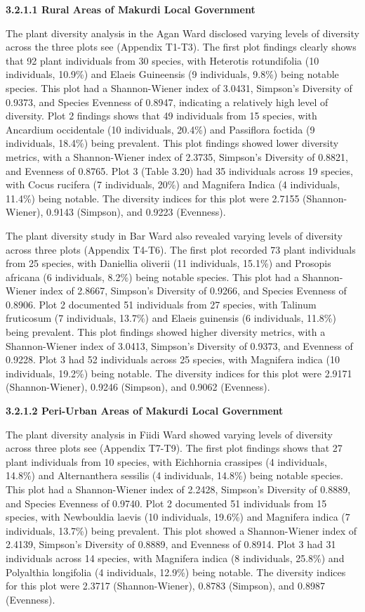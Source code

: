 {}\textbf{3.2.1.1 Rural Areas of Makurdi Local Government}

The plant diversity analysis in the Agan Ward disclosed varying levels of diversity across the three plots see (Appendix T1-T3). The first plot findings clearly shows that 92 plant individuals from 30 species, with Heterotis rotundifolia (10 individuals, 10.9\%) and Elaeis Guineensis (9 individuals, 9.8\%) being notable species. This plot had a Shannon-Wiener index of 3.0431, Simpson's Diversity of 0.9373, and Species Evenness of 0.8947, indicating a relatively high level of diversity. Plot 2 findings shows that 49 individuals from 15 species, with Ancardium occidentale (10 individuals, 20.4\%) and Passiflora foctida (9 individuals, 18.4\%) being prevalent. This plot findings showed lower diversity metrics, with a Shannon-Wiener index of 2.3735, Simpson's Diversity of 0.8821, and Evenness of 0.8765. Plot 3 (Table 3.20) had 35 individuals across 19 species, with Cocus rucifera (7 individuals, 20\%) and Magnifera Indica (4 individuals, 11.4\%) being notable. The diversity indices for this plot were 2.7155 (Shannon-Wiener), 0.9143 (Simpson), and 0.9223 (Evenness).

The plant diversity study in Bar Ward also revealed varying levels of diversity across three plots (Appendix T4-T6). The first plot recorded 73 plant individuals from 25 species, with Daniellia oliverii (11 individuals, 15.1\%) and Prosopis africana (6 individuals, 8.2\%) being notable species. This plot had a Shannon-Wiener index of 2.8667, Simpson's Diversity of 0.9266, and Species Evenness of 0.8906. Plot 2 documented 51 individuals from 27 species, with Talinum fruticosum (7 individuals, 13.7\%) and Elaeis guinensis (6 individuals, 11.8\%) being prevalent. This plot findings showed higher diversity metrics, with a Shannon-Wiener index of 3.0413, Simpson's Diversity of 0.9373, and Evenness of 0.9228. Plot 3 had 52 individuals across 25 species, with Magnifera indica (10 individuals, 19.2\%) being notable. The diversity indices for this plot were 2.9171 (Shannon-Wiener), 0.9246 (Simpson), and 0.9062 (Evenness).

{}\textbf{3.2.1.2 Peri-Urban Areas of Makurdi Local Government}

The plant diversity analysis in Fiidi Ward showed varying levels of diversity across three plots see (Appendix T7-T9). The first plot findings shows that 27 plant individuals from 10 species, with Eichhornia crassipes (4 individuals, 14.8\%) and Alternanthera sessilis (4 individuals, 14.8\%) being notable species. This plot had a Shannon-Wiener index of 2.2428, Simpson's Diversity of 0.8889, and Species Evenness of 0.9740. Plot 2 documented 51 individuals from 15 species, with Newbouldia laevis (10 individuals, 19.6\%) and Magnifera indica (7 individuals, 13.7\%) being prevalent. This plot showed a Shannon-Wiener index of 2.4139, Simpson's Diversity of 0.8889, and Evenness of 0.8914. Plot 3 had 31 individuals across 14 species, with Magnifera indica (8 individuals, 25.8\%) and Polyalthia longifolia (4 individuals, 12.9\%) being notable. The diversity indices for this plot were 2.3717 (Shannon-Wiener), 0.8783 (Simpson), and 0.8987 (Evenness).

